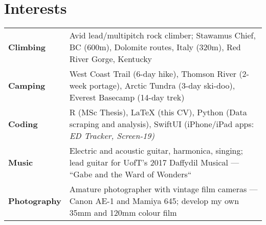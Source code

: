 \documentclass[a4paper,10pt,oneside,onecolumn,draft]{article} %
\begin{document}
\section*{Interests}
\begin{supertabular*}{1\textwidth}{a@{\SubVRule}B}
  {\bfseries Climbing}&{Avid lead/multipitch rock climber; Stawamus Chief, BC (600m), Dolomite routes, Italy (320m), Red River Gorge, Kentucky}\\
  {\bfseries Camping}&{West Coast Trail (6-day hike), Thomson River (2-week portage), Arctic Tundra (3-day ski-doo), Everest Basecamp (14-day trek)}\\
  {\bfseries Coding}&{R (MSc Thesis), LaTeX (this CV), Python (Data scraping and analysis), SwiftUI (iPhone/iPad apps: \slshape ED Tracker, Screen-19)}\\
  {\bfseries Music}&{Electric and acoustic guitar, harmonica, singing; lead guitar for UofT’s 2017 Daffydil Musical --- ``Gabe and the Ward of Wonders``}\\
  {\bfseries Photography}&{Amature photographer with vintage film cameras --- Canon AE-1 and Mamiya 645; develop my own 35mm and 120mm colour film}\\
\end{supertabular*}
\end{document}
